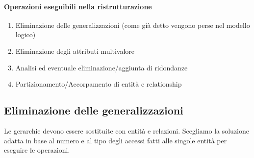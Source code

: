 \paragraph{Operazioni eseguibili nella ristrutturazione}
\begin{enumerate}
	\item Eliminazione delle generalizzazioni (come già detto vengono perse nel modello logico)
	\item Eliminazione degli attributi multivalore
	\item Analisi ed eventuale eliminazione/aggiunta di ridondanze
	\item Partizionamento/Accorpamento di entità e relationship
\end{enumerate}
\pagebreak
\small
\subsection{Eliminazione delle generalizzazioni}
Le gerarchie devono essere sostituite con entità e relazioni. Scegliamo la soluzione adatta in base al numero e al tipo degli accessi fatti alle singole entità per eseguire le operazioni. 
